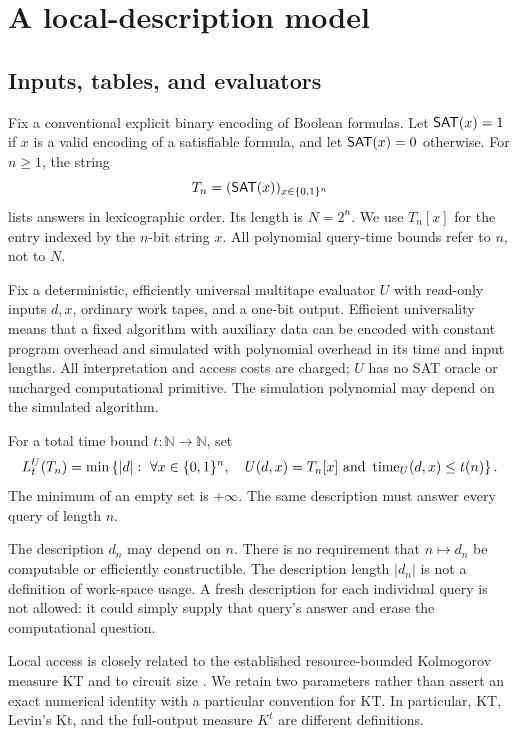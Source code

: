 \section{A local-description model}
\subsection{Inputs, tables, and evaluators}
Fix a conventional explicit binary encoding of Boolean formulas.
Let \(\mathsf{SAT}(x)=1\) if \(x\) is a valid encoding of a satisfiable formula,
and let \(\mathsf{SAT}(x)=0\) otherwise. For \(n\geq1\), the string
\[
 T_n=(\mathsf{SAT}(x))_{x\in\{0,1\}^n}
\]
lists answers in lexicographic order. Its length is \(N=2^n\).
We use \(T_n[x]\) for the entry indexed by the \(n\)-bit string \(x\).
All polynomial query-time bounds refer to \(n\), not to \(N\).

Fix a deterministic, efficiently universal multitape evaluator \(U\) with
read-only inputs \(d,x\), ordinary work tapes, and a one-bit output.
Efficient universality means that a fixed algorithm with auxiliary data can
be encoded with constant program overhead and simulated with polynomial
overhead in its time and input lengths. All interpretation and access costs
are charged; \(U\) has no SAT oracle or uncharged computational primitive.
The simulation polynomial may depend on the simulated algorithm.

\begin{definition}\label{def:local}
For a total time bound \(t:\mathbb N\to\mathbb N\), set
\[
 L^{U}_t(T_n)=\min\left\{
 |d|:\ \forall x\in\{0,1\}^n,\quad
 U(d,x)=T_n[x]\ \text{and}\ \operatorname{time}_{U}(d,x)\leq t(n)
 \right\}.
\]
The minimum of an empty set is \(+\infty\).
The same description must answer every query of length \(n\).
\end{definition}

The description \(d_n\) may depend on \(n\). There is no requirement that
\(n\mapsto d_n\) be computable or efficiently constructible.
The description length \(|d_n|\) is not a definition of work-space usage.
A fresh description for each individual query is not allowed: it could
simply supply that query's answer and erase the computational question.

Local access is closely related to the established resource-bounded
Kolmogorov measure \(\mathrm{KT}\) and to circuit size
\cite{AllenderEtAl2006}. We retain two parameters rather than assert
an exact numerical identity with a particular convention for
\(\mathrm{KT}\). In particular, \(\mathrm{KT}\), Levin's \(\mathrm{Kt}\),
and the full-output measure \(K^t\) are different definitions.

